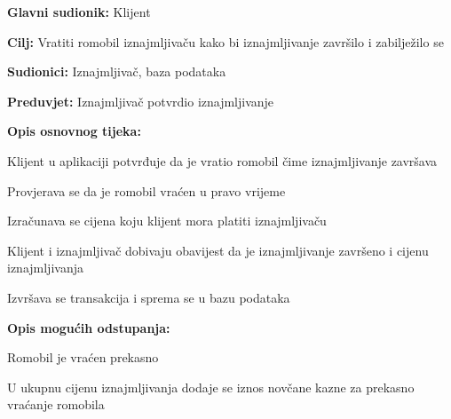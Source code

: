 						\noindent {}
						\begin{packed_item}
							
							\item \textbf{Glavni sudionik: }Klijent
							\item  \textbf{Cilj: }Vratiti romobil iznajmljivaču kako bi iznajmljivanje završilo i zabilježilo se
							\item  \textbf{Sudionici: }Iznajmljivač, baza podataka
							\item  \textbf{Preduvjet: }Iznajmljivač potvrdio iznajmljivanje
							\item  \textbf{Opis osnovnog tijeka:}
							
							\item[] \begin{packed_enum}
								
								\item Klijent u aplikaciji potvrđuje da je vratio romobil čime iznajmljivanje završava 
								\item Provjerava se da je romobil vraćen u pravo vrijeme 
								\item Izračunava se cijena koju klijent mora platiti iznajmljivaču 
								\item Klijent i iznajmljivač dobivaju obavijest da je iznajmljivanje završeno i cijenu iznajmljivanja  
								\item Izvršava se transakcija i sprema se u bazu podataka
							\end{packed_enum}
							
							\item  \textbf{Opis mogućih odstupanja:}
							
							\item[] \begin{packed_item}
								
								\item[2.a] Romobil je vraćen prekasno 
								\item[] \begin{packed_enum}
									
									\item U ukupnu cijenu iznajmljivanja dodaje se iznos novčane kazne za prekasno vraćanje romobila 
									
									
								\end{packed_enum}
								
							\end{packed_item}
						\end{packed_item}
